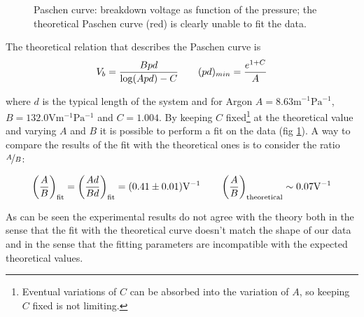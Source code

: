\documentclass[11pt,a4 paper]{article}
\let\oldfrac\frac
\renewcommand{\frac}[3][d]{\ifthenelse{\equal{#1}{d}}{\oldfrac{#2}{#3}}{\nicefrac{#2}{#3}}}
\begin{document}
\begin{figure}[H]
  \centering
  \caption{Paschen curve: breakdown voltage as function of the pressure; the theoretical Paschen curve (red) is clearly unable to fit the data.}
  \label{fig:DCP}
\end{figure}

The theoretical relation that describes the Paschen curve is
\begin{gather} \label{eq:paschen}
  V_b = \frac{Bpd}{\log(Apd) - C} \qquad (pd)_{min} = \frac{e^{1+C}}{A}
\end{gather}

where $d$ is the typical length of the system and for Argon $A = 8.63 \si{\metre^{-1}\pascal^{-1}}$, $B = 132.0 \si{\volt\metre^{-1}\pascal^{-1}}$ and $C = 1.004$. By keeping $C$ fixed\footnote{Eventual variations of $C$ can be absorbed into the variation of $A$, so keeping $C$ fixed is not limiting.} at the theoretical value and varying $A$ and $B$ it is possible to perform a fit on the data (fig \ref{fig:DCP}).
A way to compare the results of the fit with the theoretical ones is to consider the ratio $\frac[f]{A}{B}$:

\begin{gather*}
  \left( \frac{A}{B} \right)_{\text{fit}} = \left( \frac{Ad}{Bd} \right)_{\text{fit}} = (0.41 \pm 0.01) \si{\volt^{-1}} \qquad
  \left( \frac{A}{B} \right)_{\text{theoretical}} \sim 0.07 \si{\volt^{-1}}
\end{gather*}

As can be seen the experimental results do not agree with the theory both in the sense that the fit with the theoretical curve doesn't match the shape of our data and in the sense that the fitting parameters are incompatible with the expected theoretical values.

\end{document}
